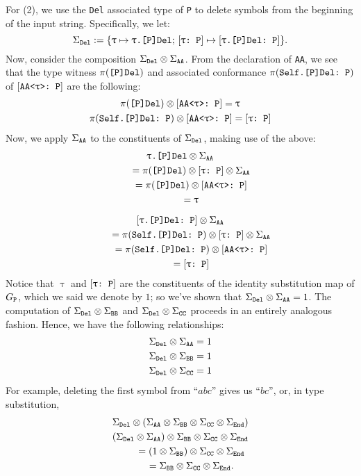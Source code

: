 \documentclass[../generics]{subfiles}
\begin{document}
For (2), we use the \texttt{Del} associated type of \texttt{P} to delete symbols from the beginning of the input string. Specifically, we let:
\[
\Sigma_{\texttt{Del}} := \{\texttt{$\uptau$} \mapsto \texttt{$\uptau$.[P]Del};\,[\texttt{$\uptau$:~P}] \mapsto [\texttt{$\uptau$.[P]Del:~P}]\}.
\]
Now, consider the composition $\Sigma_{\texttt{Del}}\otimes\Sigma_{\texttt{AA}}$. From the declaration of \texttt{AA}, we see that the type witness $\pi(\texttt{[P]Del})$ and associated conformance $\pi(\texttt{Self.[P]Del:~P})$ of $[\texttt{AA<$\uptau$>:~P}]$ are the following:
\begin{gather*}
\pi(\texttt{[P]Del})\otimes[\texttt{AA<$\uptau$>:~P}]=\uptau\\
\pi(\texttt{Self.[P]Del:~P})\otimes[\texttt{AA<$\uptau$>:~P}]=[\texttt{$\uptau$:~P}]
\end{gather*}
Now, we apply $\Sigma_{\texttt{AA}}$ to the constituents of $\Sigma_{\texttt{Del}}$, making use of the above:
\begin{gather*}
\texttt{$\uptau$.[P]Del} \otimes \Sigma_{\texttt{AA}}\\
\qquad {} = \pi(\texttt{[P]Del}) \otimes [\texttt{$\uptau$:~P}] \otimes \Sigma_{\texttt{AA}}\\
\qquad {} = \pi(\texttt{[P]Del}) \otimes [\texttt{AA<$\uptau$>:~P}]\\
\qquad {} = \uptau\\[\medskipamount]
[\texttt{$\uptau$.[P]Del:~P}] \otimes \Sigma_{\texttt{AA}}\\
\qquad {} = \pi(\texttt{Self.[P]Del:~P}) \otimes [\texttt{$\uptau$:~P}] \otimes \Sigma_{\texttt{AA}}\\
\qquad {} = \pi(\texttt{Self.[P]Del:~P}) \otimes [\texttt{AA<$\uptau$>:~P}]\\
\qquad {} = [\texttt{$\uptau$:~P}]
\end{gather*}
Notice that $\uptau$ and $[\texttt{$\uptau$:~P}]$ are the constituents of the identity substitution map of $G_{\texttt{P}}$, which we said we denote by $1$; so we've shown that $\Sigma_{\texttt{Del}}\otimes\Sigma_{\texttt{AA}}=1$. The computation of $\Sigma_{\texttt{Del}}\otimes\Sigma_{\texttt{BB}}$ and $\Sigma_{\texttt{Del}}\otimes\Sigma_{\texttt{CC}}$ proceeds in an entirely analogous fashion. Hence, we have the following relationships:
\begin{gather*}
\Sigma_{\texttt{Del}}\otimes\Sigma_{\texttt{AA}} = 1\\
\Sigma_{\texttt{Del}}\otimes\Sigma_{\texttt{BB}} = 1\\
\Sigma_{\texttt{Del}}\otimes\Sigma_{\texttt{CC}} = 1
\end{gather*}
For example, deleting the first symbol from ``$abc$'' gives us ``$bc$'', or, in type substitution,
\begin{gather*}
\Sigma_{\texttt{Del}}\otimes\left(\Sigma_{\texttt{AA}}\otimes\Sigma_{\texttt{BB}}\otimes\Sigma_{\texttt{CC}}\otimes\Sigma_{\texttt{End}}\right)\\
\left(\Sigma_{\texttt{Del}}\otimes\Sigma_{\texttt{AA}}\right)\otimes\Sigma_{\texttt{BB}}\otimes\Sigma_{\texttt{CC}}\otimes\Sigma_{\texttt{End}}\\
\qquad {} =\left(1\otimes\Sigma_{\texttt{BB}}\right)\otimes\Sigma_{\texttt{CC}}\otimes\Sigma_{\texttt{End}}\\
\qquad {} =\Sigma_{\texttt{BB}}\otimes\Sigma_{\texttt{CC}}\otimes\Sigma_{\texttt{End}}.
\end{gather*}
\end{document}
